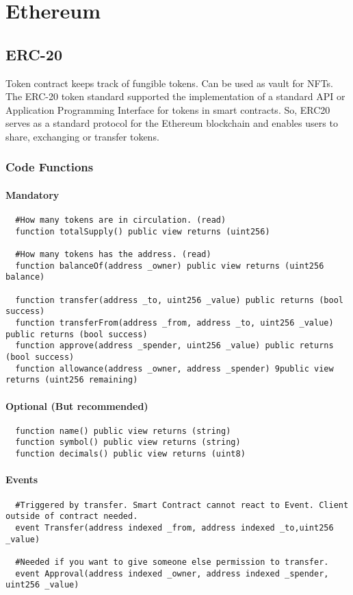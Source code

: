 \section{Ethereum}
\subsection{ERC-20}
Token contract keeps track of fungible tokens.
Can be used as vault for NFTs.
The ERC-20 token standard supported the implementation of a standard API or Application Programming Interface for tokens in smart contracts. 
So, ERC20 serves as a standard protocol for the Ethereum blockchain and enables users to share, exchanging or transfer tokens.

\subsubsection{Code Functions}
\paragraph{Mandatory}
\begin{lstlisting}
  #How many tokens are in circulation. (read)
  function totalSupply() public view returns (uint256)

  #How many tokens has the address. (read)
  function balanceOf(address _owner) public view returns (uint256 balance)

  function transfer(address _to, uint256 _value) public returns (bool success)
  function transferFrom(address _from, address _to, uint256 _value) public returns (bool success)
  function approve(address _spender, uint256 _value) public returns (bool success)
  function allowance(address _owner, address _spender) 9public view returns (uint256 remaining)
\end{lstlisting}
\paragraph{Optional (But recommended)}
\begin{lstlisting}
  function name() public view returns (string)
  function symbol() public view returns (string)
  function decimals() public view returns (uint8)
\end{lstlisting}
\paragraph{Events}
\begin{lstlisting}
  #Triggered by transfer. Smart Contract cannot react to Event. Client outside of contract needed.
  event Transfer(address indexed _from, address indexed _to,uint256 _value)
  
  #Needed if you want to give someone else permission to transfer.
  event Approval(address indexed _owner, address indexed _spender, uint256 _value)
\end{lstlisting}

